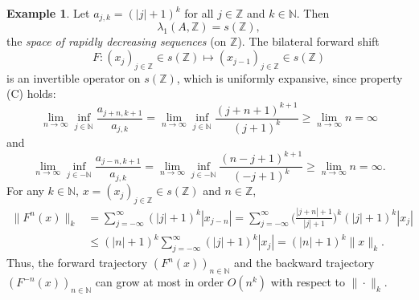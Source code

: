 \documentclass[12pt]{amsart}
\theoremstyle{theorem}
\theoremstyle{definition}
\newtheorem{example}[theorem]{Example}
\theoremstyle{remark} \theoremstyle{question} \theoremstyle{example}
\newcommand{\N}{\mathbb{N}}   %
\newcommand{\Z}{\mathbb{Z}}   %
\begin{document}
\begin{example}\label{UEWS-E2}
Let $a_{j,k} = (|j| + 1)^k$ for all $j \in \Z$ and $k \in \N$. Then
\[
\lambda_1(A,\Z) = s(\Z),
\]
the {\em space of rapidly decreasing sequences} (on $\Z$). The bilateral forward shift
\[
F : (x_j)_{j \in \Z} \in s(\Z) \mapsto (x_{j-1})_{j \in \Z} \in s(\Z)
\]
is an invertible operator on $s(\Z)$, which is uniformly expansive, since property (C) holds:
\[
\lim_{n \to \infty} \inf_{j \in \N} \frac{a_{j+n,k+1}}{a_{j,k}} 
  = \lim_{n \to \infty} \inf_{j \in \N} \frac{(j+n+1)^{k+1}}{(j+1)^k} \geq \lim_{n \to \infty} n = \infty
\]
and
\[
\lim_{n \to \infty} \inf_{j \in -\N} \frac{a_{j-n,k+1}}{a_{j,k}} 
  = \lim_{n \to \infty} \inf_{j \in -\N} \frac{(n-j+1)^{k+1}}{(-j+1)^k} \geq \lim_{n \to \infty} n = \infty.
\]
For any $k \in \N$, $x = (x_j)_{j \in \Z} \in s(\Z)$ and $n \in \Z$,
\begin{align*}
\|F^n(x)\|_k &= \sum_{j=-\infty}^\infty (|j|+1)^k |x_{j-n}| 
    = \sum_{j=-\infty}^\infty \Big(\frac{|j+n|+1}{|j|+1}\Big)^k (|j|+1)^k |x_j|\\
  &\leq (|n| + 1)^k \sum_{j=-\infty}^\infty (|j|+1)^k |x_j| = (|n| + 1)^k \|x\|_k.
\end{align*}
Thus, the forward trajectory $(F^n(x))_{n \in \N}$ and the backward trajectory $(F^{-n}(x))_{n \in \N}$ 
can grow at most in order $O(n^k)$ with respect to $\|\cdot\|_k$.
\end{example}
\end{document}
